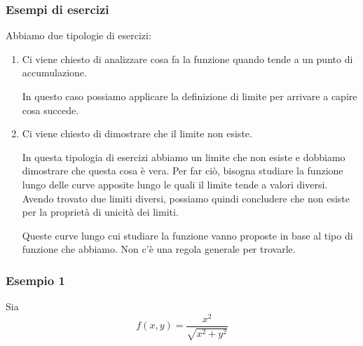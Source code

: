 
\pagebreak

\subsubsection{Esempi di esercizi}

Abbiamo due tipologie di esercizi:

\begin{enumerate}
    \item Ci viene chiesto di analizzare cosa fa la funzione quando tende a un punto di accumulazione.

          In questo caso possiamo applicare la definizione di limite per arrivare a capire cosa succede.
    \item Ci viene chiesto di dimostrare che il limite non esiste.

          In questa tipologia di esercizi abbiamo un limite che non esiste e dobbiamo dimostrare che questa cosa è vera. Per far ciò, bisogna studiare la funzione lungo delle curve apposite lungo le quali il limite tende a valori diversi. Avendo trovato due limiti diversi, possiamo quindi concludere che non esiste per la proprietà di unicità dei limiti.

          Queste curve lungo cui studiare la funzione vanno proposte in base al tipo di funzione che abbiamo. Non c'è una regola generale per trovarle.
\end{enumerate}

\subsubsection*{Esempio 1}

Sia
\[
    f(x,y) = \frac{x^{2}}{\sqrt{x^{2}+y^{2}}}
\]

